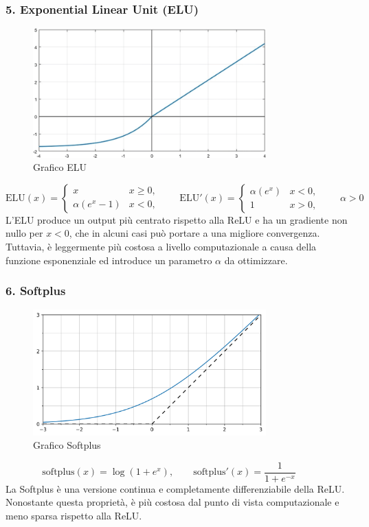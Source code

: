 \documentclass[a4paper,12pt]{report}
\begin{document}
	\subsubsection{5. Exponential Linear Unit (ELU)}
	\begin{figure}[H]
		\centering
		\includegraphics[width=0.8\textwidth]{img/elu.png}
		\caption{Grafico ELU}
	\end{figure}
	\[
	\mathrm{ELU}(x)=\begin{cases}x & x\ge0,\\ \alpha(e^x-1) & x<0,\end{cases}\qquad
	\mathrm{ELU}'(x)=\begin{cases}\alpha(e^x) & x<0,\\ 1 & x>0,\end{cases}\qquad \alpha>0
	\]
	L'ELU produce un output più centrato rispetto alla ReLU e ha un gradiente non nullo per $x<0$, che in alcuni casi può portare a una migliore convergenza. Tuttavia, è leggermente più costosa a livello computazionale a causa della funzione esponenziale ed introduce un parametro $\alpha$ da ottimizzare.
	
	\subsubsection{6. Softplus}
	\begin{figure}[H]
		\centering
		\includegraphics[width=0.8\textwidth]{img/softplus.png}
		\caption{Grafico Softplus}
	\end{figure}
	\[
	\mathrm{softplus}(x)=\log(1+e^x),\qquad
	\mathrm{softplus}'(x)=\frac{1}{1+e^{-x}}\qquad
	\]
	La Softplus è una versione continua e completamente differenziabile della ReLU. Nonostante questa proprietà, è più costosa dal punto di vista computazionale e meno sparsa rispetto alla ReLU.
	
\end{document}
